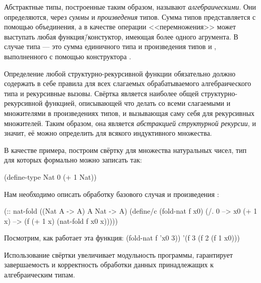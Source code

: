 \noindent
Абстрактные типы, построенные таким образом, называют \emph{алгебраическими}. Они определяются, через \emph{суммы} и \emph{произведения} типов. Сумма типов представляется с помощью объединения, а в качестве операции <<перемножения>> может выступать любая функция\=/констуктор, имеющая более одного агрумента. В случае типа  --- это сумма единичного типа  и произведения типов  и , выполненного с помощью конструктора .

Определение любой структурно-рекурсивной функции обязательно должно содержать в себе правила для всех слагаемых обрабатываемого алгебраического типа и рекурсивные вызовы. Свёртка является наиболее общей структурно-рекурсивной функцией, описывающей что делать со всеми слагаемыми и множителями в произведениях типов, и вызывающая саму себя для рекурсивных множителей.
Таким образом, она является \emph{абстракцией структурной рекурсии}, и значит, её можно определить для всякого индуктивного множества. 

В качестве примера, построим свёртку для множества натуральных чисел, тип для которых формально можно записать так:
\vspace{-\bigskipamount}
\begin{SchemeCode}
(define-type Nat
  0
  (+ 1 Nat))
\end{SchemeCode}

\noindent
Нам необходимо описать обработку базового случая  и произведения :
\begin{Definition}
(:: nat-fold ((Nat A -> A) A Nat -> A)
  (define/c (fold-nat f x0)
    (/. 0 --> x0
        (+ 1 x) --> (f (+ 1 x) (nat-fold f x0 x)))))
\end{Definition}

\begin{example}{%
Посмотрим, как работает эта функция:}
\REPL
  {(fold-nat f 'x0 3))}
  {'(f 3 (f 2 (f 1 x0)))}
\end{example}

Использование свёртки увеличивает модульность программы, гарантирует завершаемость и корректность обработки данных принадлежащих к алгебраическим типам.

